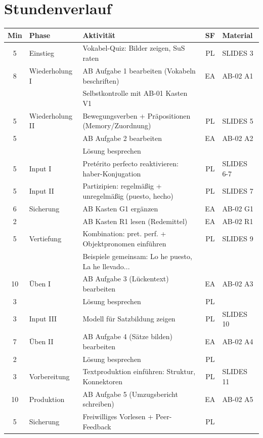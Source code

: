 \documentclass[11pt, a4paper]{article}
\begin{document}

\section*{Stundenverlauf}

\begin{tabularx}{\textwidth}{@{}c|l|X|c|l@{}}
\textbf{Min} & \textbf{Phase} & \textbf{Aktivität} & \textbf{SF} & \textbf{Material} \\
\midrule
5 & Einstieg & Vokabel-Quiz: Bilder zeigen, SuS raten & PL & SLIDES 3 \\
\midrule
8 & Wiederholung I & AB Aufgabe 1 bearbeiten (Vokabeln beschriften) & EA & AB-02 A1 \\
& & Selbstkontrolle mit AB-01 Kasten V1 & & \\
\midrule
5 & Wiederholung II & Bewegungsverben + Präpositionen (Memory/Zuordnung) & PL & SLIDES 5 \\
\midrule
5 & & AB Aufgabe 2 bearbeiten & EA & AB-02 A2 \\
& & Lösung besprechen & & \\
\midrule
5 & Input I & Pretérito perfecto reaktivieren: haber-Konjugation & PL & SLIDES 6-7 \\
\midrule
5 & Input II & Partizipien: regelmäßig + unregelmäßig (puesto, hecho) & PL & SLIDES 7 \\
\midrule
6 & Sicherung & AB Kasten G1 ergänzen & EA & AB-02 G1 \\
\midrule
2 & & AB Kasten R1 lesen (Redemittel) & EA & AB-02 R1 \\
\midrule
5 & Vertiefung & Kombination: pret. perf. + Objektpronomen einführen & PL & SLIDES 9 \\
& & Beispiele gemeinsam: Lo he puesto, La he llevado... & & \\
\midrule
10 & Üben I & AB Aufgabe 3 (Lückentext) bearbeiten & EA & AB-02 A3 \\
\midrule
3 & & Lösung besprechen & PL & \\
\midrule
3 & Input III & Modell für Satzbildung zeigen & PL & SLIDES 10 \\
\midrule
7 & Üben II & AB Aufgabe 4 (Sätze bilden) bearbeiten & EA & AB-02 A4 \\
\midrule
2 & & Lösung besprechen & PL & \\
\midrule
3 & Vorbereitung & Textproduktion einführen: Struktur, Konnektoren & PL & SLIDES 11 \\
\midrule
10 & Produktion & AB Aufgabe 5 (Umzugsbericht schreiben) & EA & AB-02 A5 \\
\midrule
5 & Sicherung & Freiwilliges Vorlesen + Peer-Feedback & PL & \\
\bottomrule
\end{tabularx}
\end{document}
